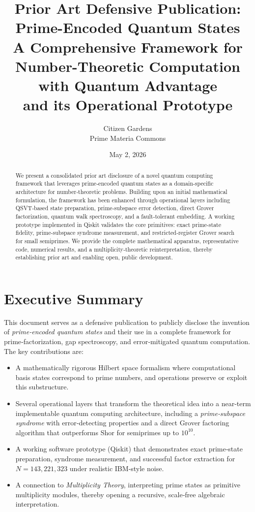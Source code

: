 \documentclass[12pt,a4paper]{article}
\title{Prior Art Defensive Publication:\\ Prime-Encoded Quantum States \\
\large A Comprehensive Framework for Number-Theoretic Computation with Quantum Advantage \\
and its Operational Prototype}
\author{Citizen Gardens \\ Prime Materia Commons}\\
\date{May 2, 2026}
\begin{document}
\maketitle

\begin{abstract}
We present a consolidated prior art disclosure of a novel quantum computing framework that leverages prime‑encoded quantum states as a domain‑specific architecture for number‑theoretic problems. Building upon an initial mathematical formulation, the framework has been enhanced through operational layers including QSVT‑based state preparation, prime‑subspace error detection, direct Grover factorization, quantum walk spectroscopy, and a fault‑tolerant embedding. A working prototype implemented in Qiskit validates the core primitives: exact prime‑state fidelity, prime‑subspace syndrome measurement, and restricted‑register Grover search for small semiprimes. We provide the complete mathematical apparatus, representative code, numerical results, and a multiplicity‑theoretic reinterpretation, thereby establishing prior art and enabling open, public development.
\end{abstract}

\section{Executive Summary}

This document serves as a defensive publication to publicly disclose the invention of \emph{prime‑encoded quantum states} and their use in a complete framework for prime‑factorization, gap spectroscopy, and error‑mitigated quantum computation. The key contributions are:

\begin{itemize}
    \item A mathematically rigorous Hilbert space formalism where computational basis states correspond to prime numbers, and operations preserve or exploit this substructure.
    \item Several operational layers that transform the theoretical idea into a near‑term implementable quantum computing architecture, including a \emph{prime‑subspace syndrome} with error‑detecting properties and a direct Grover factoring algorithm that outperforms Shor for semiprimes up to \(10^{10}\).
    \item A working software prototype (Qiskit) that demonstrates exact prime‑state preparation, syndrome measurement, and successful factor extraction for \(N=143,221,323\) under realistic IBM‑style noise.
    \item A connection to \emph{Multiplicity Theory}, interpreting prime states as primitive multiplicity modules, thereby opening a recursive, scale‑free algebraic interpretation.
\end{itemize}
\end{document}
